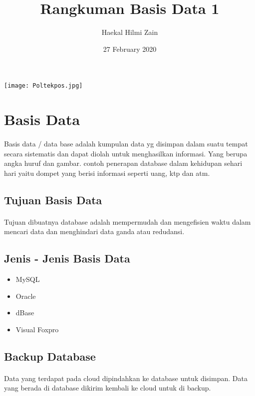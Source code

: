 \documentclass{article}
\title{Rangkuman Basis Data 1}
\author{Haekal Hilmi Zain }
\date{27 February 2020}
\begin{document}
\maketitle
\begin{center}
\texttt{[image: Poltekpos.jpg]}
\end{center}

\newpage
\section{Basis Data}
\paragraph{} Basis data / data base adalah kumpulan data yg disimpan dalam suatu tempat secara sistematis dan dapat diolah untuk menghasilkan informasi. Yang berupa angka huruf dan gambar. contoh penerapan database dalam kehidupan sehari hari yaitu dompet yang berisi informasi seperti uang, ktp dan atm. 


\subsection{Tujuan Basis Data }
\paragraph{} Tujuan dibuatnya database adalah mempermudah dan mengefisien waktu dalam mencari data dan menghindari data ganda atau redudansi.

\subsection{Jenis - Jenis Basis Data }
\begin{itemize}
    \item MySQL
    \item Oracle
    \item dBase
    \item Visual Foxpro
\end{itemize}

\subsection{Backup Database }
\paragraph{} Data yang terdapat pada cloud dipindahkan ke database untuk disimpan. Data yang berada di database dikirim kembali ke cloud untuk di backup.
\end{document}
